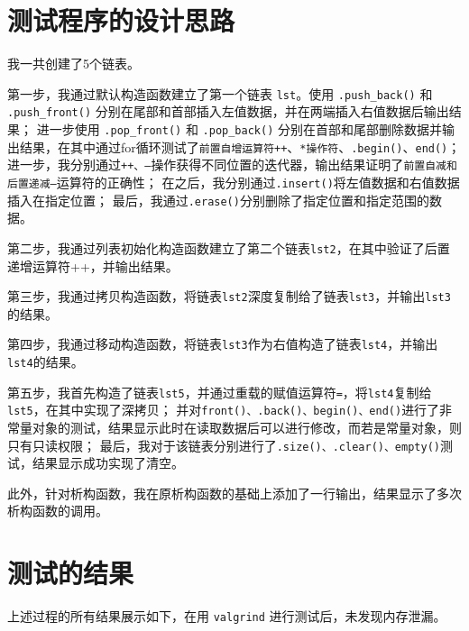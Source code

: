 \documentclass[UTF8]{ctexart}
\begin{document}
\pagestyle{fancy}
\fancyhead{}

\section{测试程序的设计思路}

我一共创建了5个链表。

第一步，我通过默认构造函数建立了第一个链表 \texttt{lst}。使用 \texttt{.push\_back()} 和 \texttt{.push\_front()} 分别在尾部和首部插入左值数据，并在两端插入右值数据后输出结果；
进一步使用 \texttt{.pop\_front()} 和 \texttt{.pop\_back()} 分别在首部和尾部删除数据并输出结果，在其中通过for循环测试了\texttt{前置自增运算符++}、\texttt{*操作符}、\texttt{.begin()}、\texttt{end()}；
进一步，我分别通过\texttt{++、--}操作获得不同位置的迭代器，输出结果证明了\texttt{前置自减和后置递减--}运算符的正确性；
在之后，我分别通过\texttt{.insert()}将左值数据和右值数据插入在指定位置；
最后，我通过\texttt{.erase()}分别删除了指定位置和指定范围的数据。

第二步，我通过列表初始化构造函数建立了第二个链表\texttt{lst2}，在其中验证了后置递增运算符++，并输出结果。

第三步，我通过拷贝构造函数，将链表\texttt{lst2}深度复制给了链表\texttt{lst3}，并输出\texttt{lst3}的结果。

第四步，我通过移动构造函数，将链表\texttt{lst3}作为右值构造了链表\texttt{lst4}，并输出\texttt{lst4}的结果。

第五步，我首先构造了链表\texttt{lst5}，并通过重载的赋值运算符\texttt{=}，将\texttt{lst4}复制给\texttt{lst5}，在其中实现了深拷贝；
并对\texttt{front()、.back()、begin()、end()}进行了非常量对象的测试，结果显示此时在读取数据后可以进行修改，而若是常量对象，则只有只读权限；
最后，我对于该链表分别进行了\texttt{.size()、.clear()、empty()}测试，结果显示成功实现了清空。

此外，针对析构函数，我在原析构函数的基础上添加了一行输出，结果显示了多次析构函数的调用。



\section{测试的结果}
上述过程的所有结果展示如下，在用 \texttt{valgrind} 进行测试后，未发现内存泄漏。
\end{document}
